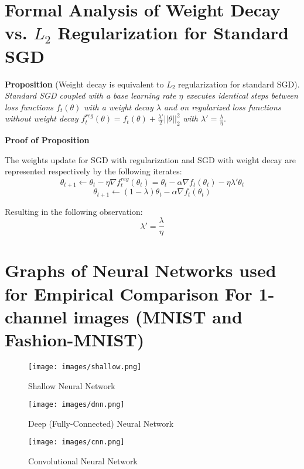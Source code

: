 \documentclass{article} %
\begin{document}



\newpage
\appendix
\section{Formal Analysis of Weight Decay vs. $L_2$ Regularization for Standard SGD}
\textbf{Proposition} (Weight decay is equivalent to $L_2$ regularization for standard SGD).
\textit{Standard SGD coupled with a base learning rate $\eta$ executes identical steps between
loss functions $f_t(\theta)$ with a weight decay $\lambda$ and on regularized loss functions
without weight decay $f^{reg}_t(\theta)=f_t(\theta)+\frac{\lambda'}{2}||\theta||^2_2$
with $\lambda'=\frac{\lambda}{\eta}$}.

\textbf{Proof of Proposition} 

The weights update for SGD with regularization and SGD with weight decay are represented
respectively by the following iterates:
$$\theta_{t+1} \leftarrow \theta_t - \eta\nabla f^{reg}_t(\theta_t) = \theta_t - \alpha\nabla f_t(\theta_t) - \eta\lambda'\theta_t$$
$$\theta_{t+1} \leftarrow (1-\lambda)\theta_t - \alpha\nabla f_t(\theta_t)$$

Resulting in the following observation:
$$\lambda' = \frac{\lambda}{\eta}$$

\newpage
\section{Graphs of Neural Networks used for Empirical Comparison For 1-channel images (MNIST and Fashion-MNIST)}

\begin{figure}[h]
\begin{center}
\texttt{[image: images/shallow.png]}
\end{center}
\caption{Shallow Neural Network}
\end{figure}

\begin{figure}[h]
\begin{center}
\texttt{[image: images/dnn.png]}
\end{center}
\caption{Deep (Fully-Connected) Neural Network}
\end{figure}

\begin{figure}[h]
\begin{center}
\texttt{[image: images/cnn.png]}
\end{center}
\caption{Convolutional Neural Network}
\end{figure}
\end{document}
